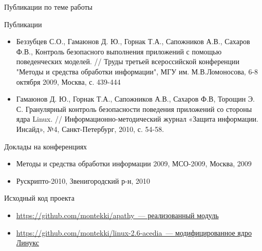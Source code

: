 \documentclass{beamer}
\begin{document}
\begin{frame}{Публикации по теме работы}

\begin{tiny}
\begin{block}{Публикации}
\begin{itemize}
\item Беззубцев С.О., Гамаюнов Д. Ю., Горнак Т.А., Сапожников А.В., Сахаров Ф.В., Контроль безопасного выполнения приложений с помощью поведенческих моделей. // Труды третьей всероссийской конференции "Методы и средства обработки информации", МГУ им. М.В.Ломоносова, 6-8 октября 2009, Москва, с. 439-444
\item Гамаюнов Д. Ю., Горнак Т.А., Сапожников А.В., Сахаров Ф.В, Торощин Э. С. Гранулярный контроль безопасности поведения приложений со стороны ядра Linux. // Информационно-методический журнал «Защита информации. Инсайд», №4, Санкт-Петербург, 2010, с. 54-58.


\end{itemize}
\end{block}

\begin{block}{Доклады на конференциях}
\begin{itemize}
\item Методы и средства обработки информации 2009, МСО-2009, Москва, 2009
\item Рускрипто-2010, Звенигородский р-н, 2010
\end{itemize}
\end{block}

\begin{block}{Исходный код проекта}
\begin{itemize}

\item \href{https://github.com/montekki/apathy}
    {https://github.com/montekki/apathy~--- реализованный модуль}
\item \href{https://github.com/montekki/linux-2.6-acedia/tree/acedia}
            {https://github.com/montekki/linux-2.6-acedia~--- модифицированное ядро Линукс}
\end{itemize}
\end{block}

\end{tiny}
\end{frame}

\begin{comment}
\end{comment}

\begin{comment}
  \begin{frame}{Спасибо за внимание. Вопросы?}
\begin{center}
\LARGE{Спасибо за внимание. Вопросы?}
\end{center}

   
  \end{frame}
\end{comment}

 
\end{document}
